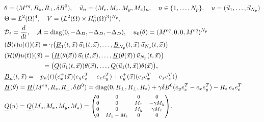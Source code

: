 \documentclass[12pt]{article}
\newcommand\skipgradient[1]{}
\newcommand\DD{\mathcal{D}}
\newcommand\calA{\mathcal{A}}
\newcommand\BB{\mathcal{B}}
\newcommand\HH{\mathcal{H}}
\newcommand\vecr{\vec{x}}
\newcommand\ulB{\underline{B}}
\newcommand\ulC{\underline{C}}
\newcommand\ulH{\underline{H}}
\newcommand\ulQ{\underline{Q}}
\newcommand\Ncont{N_p}
\begin{document}
\begin{equation}\label{defsBT}
\begin{aligned}
&\theta = (M^{eq},R_z,R_\perp,\delta B^0), \quad
\vec{u}_n=(M_e,M_x,M_y,M_z)_n, \quad n\in\{1,\ldots,\Ncont\}, \quad
u=(\vec{u}_1,\ldots,\vec{u}_{\Ncont}) \\
&\Theta=L^2(\Omega)^4, \quad V=(L^2(\Omega)\times H_0^1(\Omega)^3)^{\Ncont},\\
&\DD_t=\frac{d}{dt}, \quad
\calA=\text{diag}(0,-\Delta_D,-\Delta_D,-\Delta_D), \quad
u_0(\theta)=(M^{eq},0,0,M^{eq})^{\Ncont}\\
&(\BB(t)u(t))(\vecr)
=\gamma \bigl(\ulB_1(t,\vecr)\, \vec{u}_1(t,\vecr),\ldots,\ulB_{\Ncont}(t,\vecr)\, \vec{u}_{\Ncont}(t,\vecr)\bigr)\\
&(\HH(\theta)u(t))(\vecr)=
\bigl(\ulH(\theta(\vecr))\, \vec{u}_1(t,\vecr),\ldots,\ulH(\theta(\vecr))\, \vec{u}_{\Ncont}(t,\vecr)\bigr)\\
&\phantom{(\HH(\theta)u(t))(\vecr)}
=\bigl(\ulQ(\vec{u}_1(t,\vecr))\theta(\vecr),\ldots,\ulQ(\vec{u}_1(t,\vecr))\theta(\vecr)\bigr)
,\\
&\ulB_n(t,\vecr)= 
-p_n(t) \bigl(c_x^+(\vecr)(e_ye_z^T-e_ze_y^T)+c_y^+(\vecr)(e_ze_x^T-e_xe_z^T)\bigr) 
\skipgradient{-\vec{g}_n(t)\cdot\vecr \, (e_xe_y^T-e_ye_x^T)} 
\\
&\ulH(\theta)=\ulH(M^{eq},R_z,R_\perp,\delta B^0)=\text{diag}(0,R_\perp,R_\perp,R_z) +\gamma\delta B^0 (e_ye_x^T-e_xe_y^T)-R_z\,e_z e_e^T\\
&{\footnotesize \ulQ(u)= \ulQ(M_e,M_x,M_y,M_z)= \begin{pmatrix}
0&0&0&0\\
0&0&M_x&-\gamma M_y\\
0&0&M_y&\gamma M_x\\
0&M_z-M_e&0&0
\end{pmatrix}
}.
\end{aligned}
\end{equation}
\end{document}
